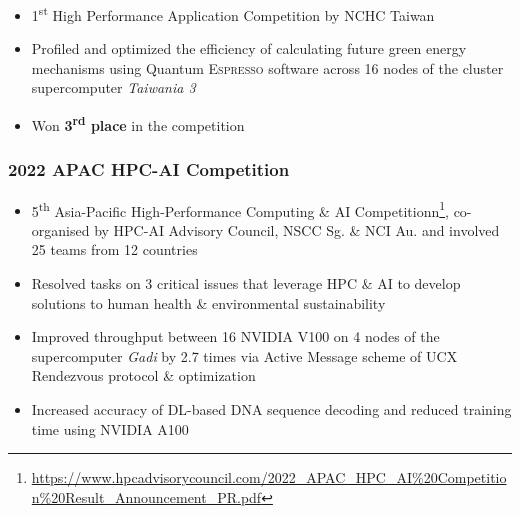 \documentclass[12pt, a4paper]{article}
\begin{document}
\begin{itemize}
\item 1\textsuperscript{st} High Performance Application Competition by NCHC Taiwan
\item Profiled and optimized the efficiency of calculating future green energy mechanisms using Quantum \textsc{Espresso} software across 16 nodes of the cluster supercomputer \emph{Taiwania 3}
\item Won \textbf{3\textsuperscript{rd} place} in the competition
\end{itemize}

\subsubsection{2022 APAC HPC-AI Competition}

%

\renewcommand\UrlFont{\ttfamily\scriptsize}

\begin{itemize}
\item 5\textsuperscript{th} Asia-Pacific High-Performance Computing \& AI Competitionn\footnote{\url{https://www.hpcadvisorycouncil.com/2022_APAC_HPC_AI\%20Competition\%20Result_Announcement_PR.pdf}}, co-organised by HPC-AI Advisory Council, NSCC Sg. \& NCI Au. and involved 25 teams from 12 countries
\item Resolved tasks on 3 critical issues that leverage HPC \& AI to develop solutions to human health \& environmental sustainability
\item Improved throughput between 16 \textsf{NVIDIA V100} on 4 nodes of the supercomputer \emph{Gadi} by 2.7 times via Active Message scheme of \textsf{UCX} Rendezvous protocol \& optimization
\item Increased accuracy of DL-based DNA sequence decoding and reduced training time using \textsf{NVIDIA A100}
\end{itemize}
\end{document}
